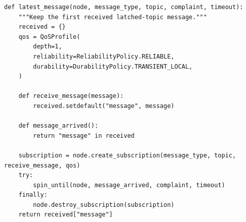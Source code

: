 \documentclass[11pt,a4paper]{book}
\begin{document}
\begin{lstlisting}[firstnumber=68]
def latest_message(node, message_type, topic, complaint, timeout):
    """Keep the first received latched-topic message."""
    received = {}
    qos = QoSProfile(
        depth=1,
        reliability=ReliabilityPolicy.RELIABLE,
        durability=DurabilityPolicy.TRANSIENT_LOCAL,
    )

    def receive_message(message):
        received.setdefault("message", message)

    def message_arrived():
        return "message" in received

    subscription = node.create_subscription(message_type, topic, receive_message, qos)
    try:
        spin_until(node, message_arrived, complaint, timeout)
    finally:
        node.destroy_subscription(subscription)
    return received["message"]


\end{lstlisting}
\end{document}
